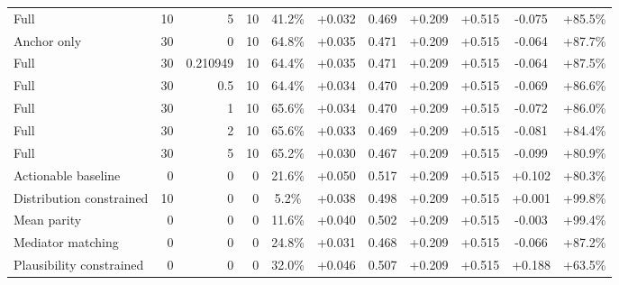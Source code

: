 \begin{table}[htbp]
\begin{tabular}{lrrrccccccc}
Full & 10 & 5 & 10 & 41.2\% & +0.032 & 0.469 & +0.209 & +0.515 & -0.075 & +85.5\% \\
Anchor only & 30 & 0 & 10 & 64.8\% & +0.035 & 0.471 & +0.209 & +0.515 & -0.064 & +87.7\% \\
Full & 30 & 0.210949 & 10 & 64.4\% & +0.035 & 0.471 & +0.209 & +0.515 & -0.064 & +87.5\% \\
Full & 30 & 0.5 & 10 & 64.4\% & +0.034 & 0.470 & +0.209 & +0.515 & -0.069 & +86.6\% \\
Full & 30 & 1 & 10 & 65.6\% & +0.034 & 0.470 & +0.209 & +0.515 & -0.072 & +86.0\% \\
Full & 30 & 2 & 10 & 65.6\% & +0.033 & 0.469 & +0.209 & +0.515 & -0.081 & +84.4\% \\
Full & 30 & 5 & 10 & 65.2\% & +0.030 & 0.467 & +0.209 & +0.515 & -0.099 & +80.9\% \\
Actionable baseline & 0 & 0 & 0 & 21.6\% & +0.050 & 0.517 & +0.209 & +0.515 & +0.102 & +80.3\% \\
Distribution constrained & 10 & 0 & 0 & 5.2\% & +0.038 & 0.498 & +0.209 & +0.515 & +0.001 & +99.8\% \\
Mean parity & 0 & 0 & 0 & 11.6\% & +0.040 & 0.502 & +0.209 & +0.515 & -0.003 & +99.4\% \\
Mediator matching & 0 & 0 & 0 & 24.8\% & +0.031 & 0.468 & +0.209 & +0.515 & -0.066 & +87.2\% \\
Plausibility constrained & 0 & 0 & 0 & 32.0\% & +0.046 & 0.507 & +0.209 & +0.515 & +0.188 & +63.5\% \\
\bottomrule
\end{tabular}
\end{table}
